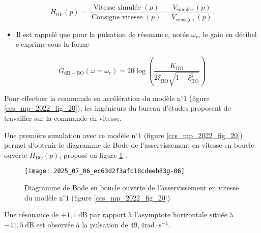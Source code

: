 $$
H_{\mathrm{BF}}(p)=\frac{\text { Vitesse simulée }(p)}{\text { Consigne vitesse }(p)}=\frac{V_{\text {simulée }}(p)}{V_{\text {consigne }}(p)} .
$$

\begin{itemize}
  \item Il est rappelé que pour la pulsation de résonance, notée $\omega_{r}$, le gain en décibel s'exprime sous la forme
\end{itemize}

$$
G_{\mathrm{dB}-\mathrm{BO}}\left(\omega=\omega_{r}\right)=20 \log \left(\frac{K_{\mathrm{BO}}}{2 \xi_{\mathrm{BO}} \sqrt{1-\xi_{\mathrm{BO}}^{2}}}\right)
$$

Pour effectuer la commande en accélération du modèle $\mathrm{n}^{\circ} 1$ (figure \ref{ccs_mp_2022_fig_20}), les ingénieurs du bureau d'études proposent de travailler sur la commande en vitesse.


Une première simulation avec ce modèle $\mathrm{n}^{\circ} 1$ (figure \ref{ccs_mp_2022_fig_20}) permet d'obtenir le diagramme de Bode de l'asservissement en vitesse en boucle ouverte $H_{\mathrm{BO}}(p)$, proposé en figure \ref{ccs_mp_2022_fig_08} .

\begin{figure}[!h]
\centering
\texttt{[image: 2025\_07\_06\_ec63d2f3afc18cdeeb83g-06]}
\caption{\label{ccs_mp_2022_fig_08}Diagramme de Bode en boucle ouverte de l'asservissement en vitesse du modèle $\mathrm{n}^{\circ} 1$ (figure \ref{ccs_mp_2022_fig_20})}
\end{figure}



Une résonance de $+1,1 \mathrm{~dB}$ par rapport à l'asymptote horizontale située à $-41,5 \mathrm{~dB}$ est observée à la pulsation de $49,4 \mathrm{rad} \cdot \mathrm{s}^{-1}$.



